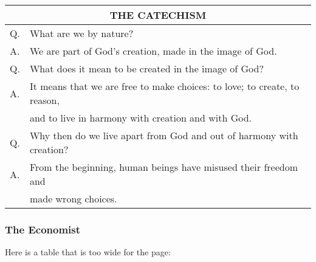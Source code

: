\documentclass{article}
\begin{document}
\begin{center}
\begin{tabular}{|ll|}
\hline
\multicolumn{2}{|c|}{\textbf{THE CATECHISM}} \\ \hline
Q. & What are we by nature? \\ 
A. & We are part of God's creation, made in the image of God. \\[3mm] 
Q. & What does it mean to be created in the image of God? \\ 
A. & It means that we are free to make choices: to love; to create, to
reason, \\[3mm] 
& and to live in harmony with creation and with God. \\ 
Q. & Why then do we live apart from God and out of harmony with creation? \\ 
A. & From the beginning, human beings have misused their freedom and \\ 
& made wrong choices. \\ \hline
\end{tabular}
\end{center}

\subsubsection{The Economist}

Here is a table that is too wide for the page:
\end{document}
